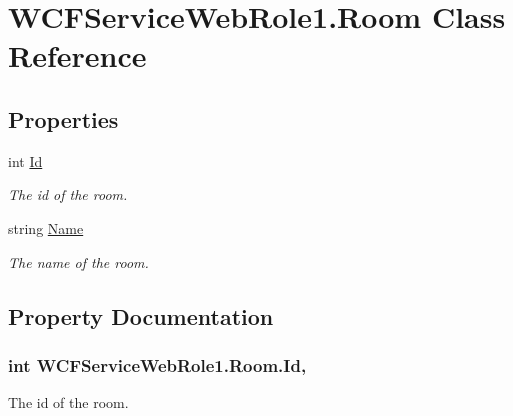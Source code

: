 \hypertarget{class_w_c_f_service_web_role1_1_1_room}{}\section{W\+C\+F\+Service\+Web\+Role1.\+Room Class Reference}
\label{class_w_c_f_service_web_role1_1_1_room}
\subsection*{Properties}
\begin{DoxyCompactItemize}
\item 
int \hyperlink{class_w_c_f_service_web_role1_1_1_room_a732db4bf7a1478e9c1a562f9f43f678a}{Id}
\begin{DoxyCompactList}\small\item\em The id of the room. \end{DoxyCompactList}\item 
string \hyperlink{class_w_c_f_service_web_role1_1_1_room_ae1873490e3785fb100de49c6ac02edb5}{Name}
\begin{DoxyCompactList}\small\item\em The name of the room. \end{DoxyCompactList}\end{DoxyCompactItemize}


\subsection{Property Documentation}
\hypertarget{class_w_c_f_service_web_role1_1_1_room_a732db4bf7a1478e9c1a562f9f43f678a}{}
\subsubsection[{Id}]{\setlength{\rightskip}{0pt plus 5cm}int W\+C\+F\+Service\+Web\+Role1.\+Room.\+Id\hspace{0.3cm}{\ttfamily [get]}, {\ttfamily [set]}}\label{class_w_c_f_service_web_role1_1_1_room_a732db4bf7a1478e9c1a562f9f43f678a}


The id of the room. 


